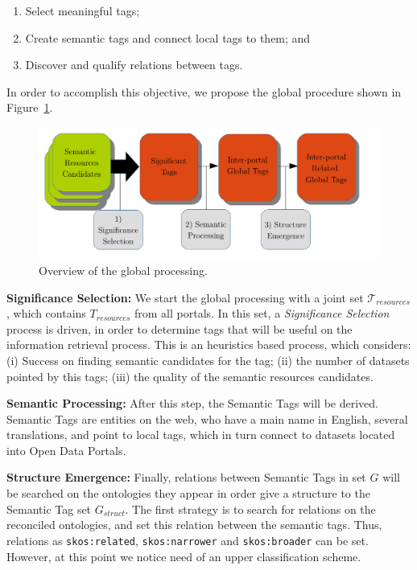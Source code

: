 \begin{enumerate}
	\item Select meaningful tags;
	\item Create semantic tags and connect local tags to them; and
	\item Discover and qualify relations between tags.
\end{enumerate}

In order to accomplish this objective, we propose the global procedure shown in Figure~\ref{fig:global_processing}.

\begin{figure}[tb]
\begin{center}
\includegraphics[width=\columnwidth]{images/global_processing.pdf}
\caption[Overview of the global processing.]{Overview of the global processing.}
\label{fig:global_processing}
\end{center}
\end{figure}

\noindent \textbf{Significance Selection: } We start the global processing with a joint set $\mathcal{T}_{resources}$, which contains $T_{resources}$ from all portals. 
In this set, a \emph{Significance Selection} process is driven, in order to determine tags that will be useful on the information retrieval process.
This is an heuristics based process, which considers: (i) Success on finding semantic candidates for the tag; (ii) the number of datasets pointed by this tags; (iii) the quality of the semantic resources candidates.

\noindent \textbf{Semantic Processing:} After this step, the Semantic Tags will be derived.
Semantic Tags are entities on the web, who have a main name in English, several translations, and point to local tags, which in turn connect to datasets located into Open Data Portals.

\noindent \textbf{Structure Emergence:} Finally, relations between Semantic Tags in set $G$ will be searched on the ontologies they appear in order give a structure to the Semantic Tag set $G_{struct}$.
The first strategy is to search for relations on the reconciled ontologies, and set this relation between the semantic tags.
Thus, relations as \texttt{skos:related}, \texttt{skos:narrower} and \texttt{skos:broader} can be set.
However, at this point we notice need of an upper classification scheme.

